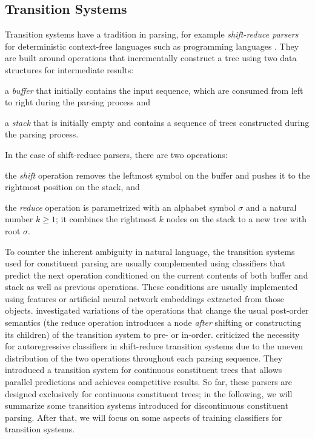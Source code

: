 \documentclass[../document.tex]{subfiles}
\begin{document}
    \subsection{Transition Systems}\label{sec:literature:transition}
    Transition systems have a tradition in parsing, for example \emph{shift-reduce parsers} for deterministic context-free languages such as programming languages \citep[Section~4.6]{aho2020compilers}.
    They are built around operations that incrementally construct a tree using two data structures for intermediate results:
    \begin{compactitem}
        \item a \emph{buffer} that initially contains the input sequence, which are consumed from left to right during the parsing process and
        \item a \emph{stack} that is initially empty and contains a sequence of trees constructed during the parsing process.
    \end{compactitem}
    In the case of shift-reduce parsers, there are two operations:
    \begin{compactitem}
        \item the \emph{shift} operation removes the leftmost symbol on the buffer and pushes it to the rightmost position on the stack, and
        \item the \emph{reduce} operation is parametrized with an alphabet symbol \(\sigma\) and a natural number \(k \ge 1\); it combines the rightmost \(k\) nodes on the stack to a new tree with root \(\sigma\).
    \end{compactitem}
    To counter the inherent ambiguity in natural language, the transition systems used for constituent parsing are usually complemented using classifiers that predict the next operation conditioned on the current contents of both buffer and stack as well as previous operations.
    These conditions are usually implemented using features or artificial neural network embeddings extracted from those objects.
     investigated variations of the operations that change the usual post-order semantics (the reduce operation introduces a node \emph{after} shifting or constructing its children) of the transition system to pre- or in-order.
     criticized the necessity for autoregressive classifiers in shift-reduce transition systems due to the uneven distribution of the two operations throughout each parsing sequence.
    They introduced a transition system for continuous constituent trees that allows parallel predictions and achieves competitive results.
    So far, these parsers are designed exclusively for continuous constituent trees; in the following, we will summarize some transition systems introduced for discontinuous constituent parsing.
    After that, we will focus on some aspects of training classifiers for transition systems.
\end{document}
